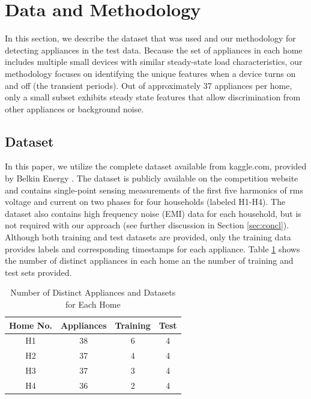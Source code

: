 \documentclass[conference]{IEEEtran}
\begin{document}
\section{Data and Methodology}\label{sec:dataMethod}

In this section, we describe the dataset that was used and our methodology for detecting appliances in the test data. Because the set of appliances in each home includes multiple small devices with similar steady-state load characteristics, our methodology focuses on identifying the unique features when a device turns on and off (the transient periods).  Out of approximately 37 appliances per home, only a small subset exhibits steady state features that allow discrimination from other appliances or background noise.   

\subsection{Dataset}

In this paper, we utilize the complete dataset available from kaggle.com, provided by Belkin Energy \cite{Kaggle}.  The dataset is publicly available on the competition website and contains single-point sensing measurements of the first five harmonics of rms voltage and current on two phases for four households (labeled H1-H4). The dataset also contains high frequency noise (EMI) data for each household, but is not required with our approach (see further discussion in Section \ref{sec:concl}).  Although both training and test datasets are provided, only the training data provides labels and corresponding timestamps for each appliance. Table \ref{table:dataset} shows the number of distinct appliances in each home an the number of training and test sets provided. 

\begin{table}[h!]
	\renewcommand{\arraystretch}{1.3}
	\caption{Number of Distinct Appliances and Datasets for Each Home}\label{classes}
	\label{table:dataset}
	\centering
	\begin{tabular}{c||c||c||c}
		\hline 
		\textbf{Home No.} & \textbf{Appliances} &\textbf{Training} &\textbf{Test}\tabularnewline
		\hline 
		\hline 
		H1 & 38 & 6 & 4\tabularnewline
		\hline 
		H2 & 37 & 4 & 4\tabularnewline
		\hline 
		H3 & 37 & 3 & 4\tabularnewline
		\hline 
		H4 & 36 & 2 & 4\tabularnewline
		\hline 
	\end{tabular}
\end{table}
\end{document}
